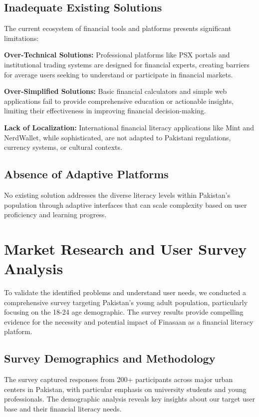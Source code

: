 \documentclass[12pt]{article}
\begin{document}
\subsection{Inadequate Existing Solutions}
The current ecosystem of financial tools and platforms presents significant limitations:

\textbf{Over-Technical Solutions:} Professional platforms like PSX portals and institutional trading systems are designed for financial experts, creating barriers for average users seeking to understand or participate in financial markets.

\textbf{Over-Simplified Solutions:} Basic financial calculators and simple web applications fail to provide comprehensive education or actionable insights, limiting their effectiveness in improving financial decision-making.

\textbf{Lack of Localization:} International financial literacy applications like Mint and NerdWallet, while sophisticated, are not adapted to Pakistani regulations, currency systems, or cultural contexts.

\subsection{Absence of Adaptive Platforms}
No existing solution addresses the diverse literacy levels within Pakistan's population through adaptive interfaces that can scale complexity based on user proficiency and learning progress.

\section{Market Research and User Survey Analysis}
To validate the identified problems and understand user needs, we conducted a comprehensive survey targeting Pakistan's young adult population, particularly focusing on the 18-24 age demographic. The survey results provide compelling evidence for the necessity and potential impact of Finasaan as a financial literacy platform.

\subsection{Survey Demographics and Methodology}
The survey captured responses from 200+ participants across major urban centers in Pakistan, with particular emphasis on university students and young professionals. The demographic analysis reveals key insights about our target user base and their financial literacy needs.
\end{document}
